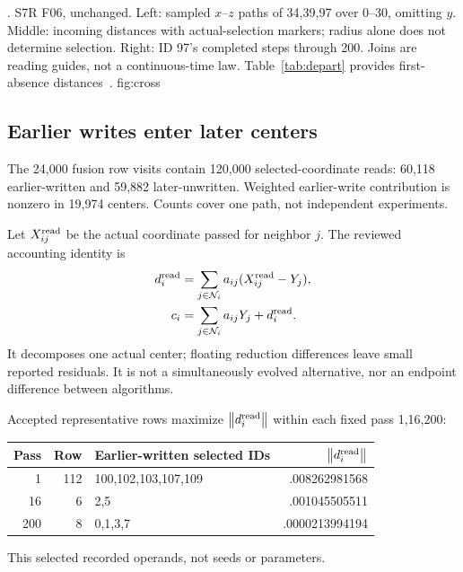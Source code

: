 {. S7R F06, unchanged. Left: sampled \(x\)--\(z\) paths of 34,39,97 over 0--30, omitting \(y\). Middle: incoming distances with actual-selection markers; radius alone does not determine selection. Right: ID 97's completed steps through 200. Joins are reading guides, not a continuous-time law. Table~\ref{tab:depart} provides first-absence distances~\citep{s7rmotion,s7rreview}.}
{fig:cross}

\subsection{Earlier writes enter later centers}
The 24,000 fusion row visits contain 120,000 selected-coordinate reads: 60,118 earlier-written and 59,882 later-unwritten. Weighted earlier-write contribution is nonzero in 19,974 centers. Counts cover one path, not independent experiments.

Let \(X^{\rm read}_{ij}\) be the actual coordinate passed for neighbor \(j\). The reviewed accounting identity is
\begin{align}
d_i^{\rm read}&=\sum_{j\in\mathcal N_i}a_{ij}(X^{\rm read}_{ij}-Y_j),\label{eq:dread}\\
c_i&=\sum_{j\in\mathcal N_i}a_{ij}Y_j+d_i^{\rm read}.\label{eq:decompose}
\end{align}
It decomposes one actual center; floating reduction differences leave small reported residuals. It is not a simultaneously evolved alternative, nor an endpoint difference between algorithms.

Accepted representative rows maximize \(\left\lVert d_i^{\rm read}\right\rVert\) within each fixed pass 1,16,200:
\begin{center}\small
\begin{tabular}{rrlr}\toprule
Pass & Row & Earlier-written selected IDs & \(\left\lVert d_i^{\rm read}\right\rVert\)\\\midrule
1 & 112 & 100,102,103,107,109 & .008262981568\\
16 & 6 & 2,5 & .001045505511\\
200 & 8 & 0,1,3,7 & .0000213994194\\
\bottomrule\end{tabular}
\end{center}
This selected recorded operands, not seeds or parameters.

